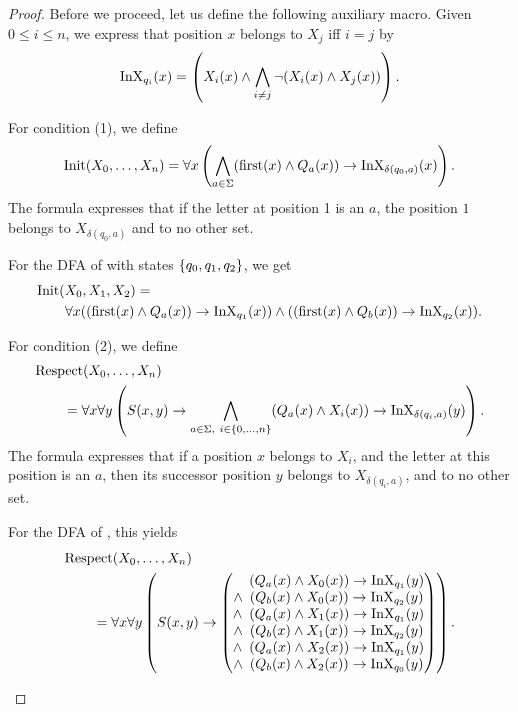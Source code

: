 \documentclass[11pt,twoside=off,numbers=noenddot]{scrbook}
\begin{document}
\begin{proof}
  Before we proceed, let us define the following auxiliary macro.
  Given $0 \leq i \leq n$, we express that position $x$ belongs to
  $X_j$ iff $i = j$ by
  \[ \text{InX}_{q_i}(x) = \left( X_i(x) \wedge \bigwedge_{i \neq j} \neg
  (X_i(x) \wedge X_j(x)) \right). \]

  For condition (1), we define
  \[ \text{Init}(X_0, \dots, X_n) = \forall x \left( \bigwedge_{a \in
      \Sigma} (\text{first}(x) \wedge Q_a(x)) \rightarrow \text{InX}_{\delta(q_0,
  a)}(x) \right). \]
  The formula expresses that if the letter at position 1 is an $a$,
  the position $1$ belongs to $X_{\delta(q_0, a)}$ and to no other set.

  \begin{example}
    For the DFA of  with states
    $\{ q_0, q_1, q_2 \}$, we get
    \begin{align*}
      & \text{Init}(X_0, X_1, X_2) = \\
      & \qquad \forall x ((\text{first}(x) \wedge Q_a(x)) \rightarrow
      \text{InX}_{q_1}(x)) \wedge ((\text{first}(x) \wedge Q_b(x)) \rightarrow
      \text{InX}_{q_2}(x)).
    \end{align*}
  \end{example}

  For condition (2), we define
  \begin{align*}
    & \text{Respect}(X_0, \dots, X_n) \\
    & \qquad = \forall x \forall y \left( S(x, y) \rightarrow
      \bigwedge_{a \in \Sigma, \ i \in \{ 0, \dots, n \}} (Q_a(x)
    \wedge X_i(x)) \rightarrow \text{InX}_{\delta(q_i, a)}(y) \right).
  \end{align*}
  The formula expresses that if a position $x$ belongs to $X_i$, and
  the letter at this position is an $a$, then its successor position
  $y$ belongs to $X_{\delta(q_i, a)}$, and to no other set.

  \begin{example}
    For the DFA of , this yields
    \begin{align*}
      & \text{Respect}(X_0, \dots, X_n) \\
      & \qquad = \forall x \forall y \left( S(x, y) \rightarrow
        \begin{pmatrix}
          \phantom{\wedge} \enskip (Q_a(x) \wedge X_0(x)) \rightarrow
          \text{InX}_{q_1}(y) \\
          \wedge \enskip (Q_b(x) \wedge X_0(x)) \rightarrow \text{InX}_{q_2}(y) \\
          \wedge \enskip (Q_a(x) \wedge X_1(x)) \rightarrow \text{InX}_{q_1}(y) \\
          \wedge \enskip (Q_b(x) \wedge X_1(x)) \rightarrow \text{InX}_{q_2}(y) \\
          \wedge \enskip (Q_a(x) \wedge X_2(x)) \rightarrow \text{InX}_{q_1}(y) \\
          \wedge \enskip (Q_b(x) \wedge X_2(x)) \rightarrow \text{InX}_{q_0}(y)
      \end{pmatrix} \right).
    \end{align*}
  \end{example}


\end{proof}
\end{document}
